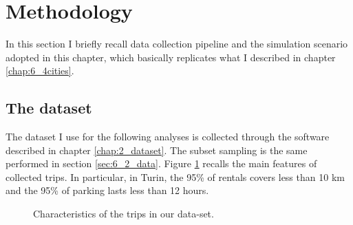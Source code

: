 \section{Methodology}
\label{sec:7_3_data}
In this section I briefly recall data collection pipeline and the simulation scenario adopted in this chapter, which basically replicates what I described in chapter \ref{chap:6_4cities}.

\subsection{The dataset}
The dataset I use for the following analyses is collected through the software described in chapter \ref{chap:2_dataset}. The subset sampling is the same performed in section \ref{sec:6_2_data}. Figure \ref{fig:7_3_ECDFs} recalls the main features of collected trips. In particular, in Turin, the 95\% of rentals covers less than 10 km and the 95\% of parking lasts less than 12 hours. 

\begin{figure}[th]
	\centering
	\caption{Characteristics of the trips in our data-set.}
	\label{fig:7_3_ECDFs}
\end{figure}


